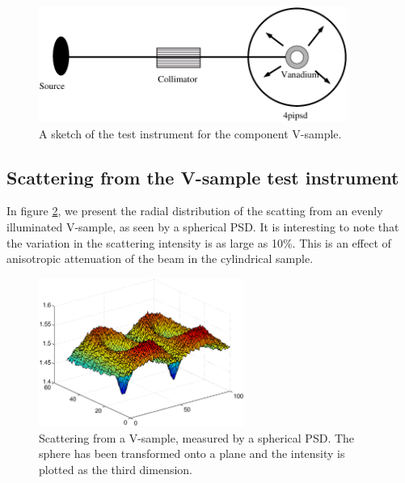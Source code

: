 \begin{figure}
  \begin{center}
    \includegraphics[width=0.9\textwidth]{figures/vanadium}
  \end{center}
\caption{A sketch of the test instrument for the component
V-sample.}
\label{f:V-instr}
\end{figure}

\subsection{Scattering from the V-sample test instrument}
\label{s:vanadium-result}

In figure \ref{f:V-results}, we present the radial distribution
of the scatting from an evenly illuminated V-sample,
as seen by a spherical PSD.
It is interesting to note that the variation in the
scattering intensity is as large as 10\%. This is an effect
of anisotropic attenuation of the beam in the cylindrical sample.

\begin{figure}
  \begin{center}
    \includegraphics[width=0.6\textwidth]{figures/vanadium-surf-2.eps}
  \end{center}
\caption{Scattering from a V-sample, measured by a spherical
  PSD. The sphere has been transformed onto a plane and the intensity is
  plotted as the third dimension. }
\label{f:V-results}
\end{figure}



